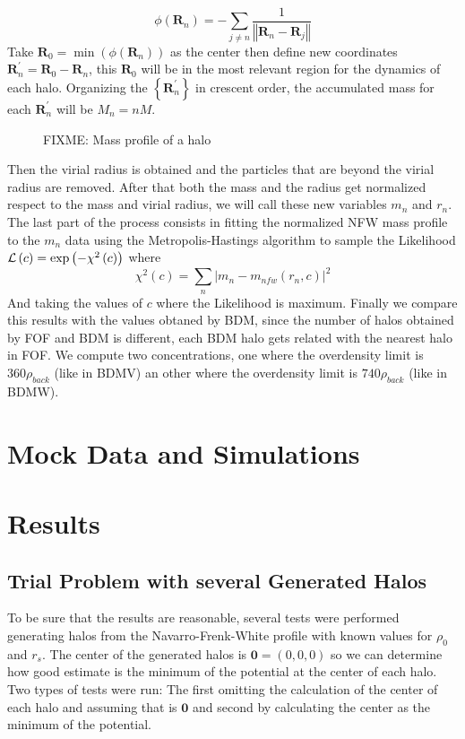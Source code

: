 \documentclass[useAMS,usenatbib]{mn2e}
\begin{document}
\[
\phi\left(\boldsymbol{R}_{n}\right)=-\sum_{j\neq n}\frac{1}{\left\Vert \boldsymbol{R}_{n}-\boldsymbol{R}_{j}\right\Vert }
\]
Take $\boldsymbol{R}_{0}=\min\left(\phi\left(\boldsymbol{R}_{n}\right)\right)$
as the center then define new coordinates $\boldsymbol{R}_{n}^{\prime}=\boldsymbol{R}_{0}-\boldsymbol{R}_{n}$,
this $\boldsymbol{R}_{0}$ will be in the most relevant region for
the dynamics of each halo. Organizing the $\left\{ \boldsymbol{R}_{n}^{\prime}\right\} $
in crescent order, the accumulated mass for each $\boldsymbol{R}_{n}^{\prime}$
will be $M_{n}=nM$.

\begin{figure}[H]
\caption{FIXME: Mass profile of a halo}
\end{figure}


Then the virial radius is obtained and the particles that are beyond
the virial radius are removed. After that both the mass and the radius
get normalized respect to the mass and virial radius, we will call
these new variables $m_{n}$ and $r_{n}$. The last part of the process
consists in fitting the normalized NFW mass profile to the $m_{n}$
data using the Metropolis-Hastings algorithm to sample the Likelihood
${\cal L}\left(c\right)=\exp\left(-\chi^{2}\left(c\right)\right)$
where 
\[
\chi^{2}\left(c\right)=\sum\limits _{n}\left|m_{n}-m_{nfw}\left(r_{n},c\right)\right|^{2}
\]
And taking the values of $c$ where the Likelihood is maximum. Finally
we compare this results with the values obtaned by BDM, since the
number of halos obtained by FOF and BDM is different, each BDM halo
gets related with the nearest halo in FOF. We compute two concentrations,
one where the overdensity limit is $360\rho_{back}$ (like in BDMV)
an other where the overdensity limit is $740\rho_{back}$ (like in
BDMW).


\section{Mock Data and Simulations}
\label{sec:data}

\section{Results}
\label{sec:results}

\subsection{Trial Problem with several Generated Halos}

To be sure that the results are reasonable, several tests were performed
generating halos from the Navarro-Frenk-White profile with known values
for $\rho_{0}$ and $r_{s}.$ The center of the generated halos is
$\boldsymbol{0}=\left(0,0,0\right)$ so we can determine how good
estimate is the minimum of the potential at the center of each halo.
Two types of tests were run: The first omitting the calculation of
the center of each halo and assuming that is $\boldsymbol{0}$ and
second by calculating the center as the minimum of the potential.
\end{document}
